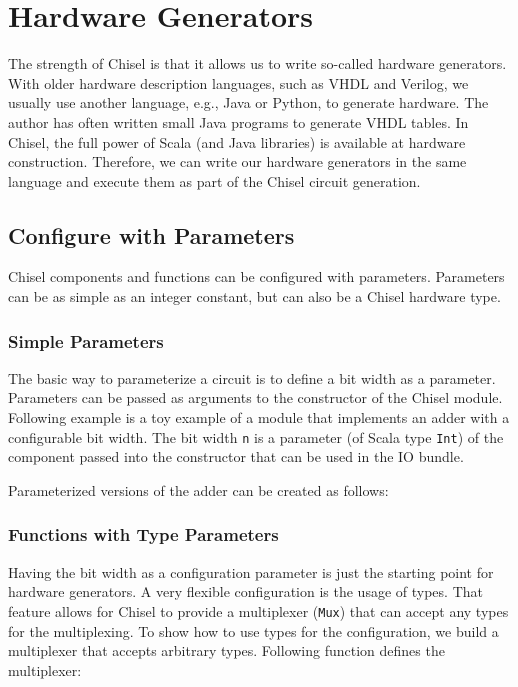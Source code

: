 \documentclass[%
    10pt,
    headinclude, footexclude,
    openright, %
    notitlepage,
    cleardoubleempty,
    headsepline,
    pointlessnumbers,
    bibtotoc, idxtotoc,
    ]{scrbook}
\newcommand{\code}[1]{{\small{\texttt{#1}}}}
\newcommand{\todo}[1]{{\emph{TODO: #1}}}
\renewcommand{\todo}[1]{}
\begin{document}
\todo{Read and cite AXI}

\chapter{Hardware Generators}

The strength of Chisel is that it allows us to write so-called hardware generators.
With older hardware description languages, such as VHDL and Verilog,
we usually use another language, e.g., Java or Python, to generate hardware.
The author has often written small Java programs to generate VHDL tables.
In Chisel, the full power of Scala (and Java libraries) is available at hardware
construction. Therefore, we can write our hardware generators in the same
language and execute them as part of the Chisel circuit generation.

\section{Configure with Parameters}

Chisel components and functions can be configured with parameters.
Parameters can be as simple as an integer constant, but can also be a Chisel
hardware type.

\subsection{Simple Parameters}

The basic way to parameterize a circuit is to define a bit width as a parameter.
Parameters can be passed as arguments to
the constructor of the Chisel module. Following example is a toy example of
a module that implements an adder with a configurable bit width.
The bit width \code{n} is a parameter (of Scala type \code{Int}) of the component
passed into the constructor that can be used in the IO bundle.


\noindent Parameterized versions of the adder can be created as follows:


\subsection{Functions with Type Parameters}

Having the bit width as a configuration parameter is just the starting point for
hardware generators. A very flexible configuration is the usage of types.
That feature allows for Chisel to provide a multiplexer (\code{Mux}) that
can accept any types for the multiplexing.
To show how to use types for the configuration, we build a multiplexer
that accepts arbitrary types. Following function defines the multiplexer:
\end{document}
